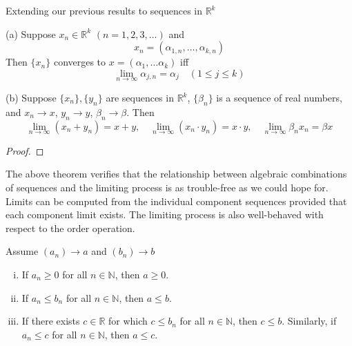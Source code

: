 \begin{theorem} Extending our previous results to sequences in $\mathbb{R}^k$

(a) Suppose $x_n \in \mathbb{R}^k$ $(n=1,2,3,\ldots)$ and
\[x_n = (\alpha_{1,n}, \ldots, \alpha_{k,n})\]
Then $\{x_n\}$ converges to $x = (\alpha_1, \ldots \alpha_k)$ iff 
\[\lim_{n\to\infty}\alpha_{j,n} = \alpha_j \quad (1\leq j \leq k)\]

(b) Suppose $\{x_n\}, \{y_n\}$ are sequences in $\mathbb{R}^k$, $\{\beta_n\}$ is a sequence of real numbers, and $x_n \to x$, $y_n \to y$, $\beta_n \to \beta$. Then
\[\lim_{n\to\infty} (x_n + y_n ) = x+y, \quad \lim_{n\to\infty} (x_n \cdot y_n ) = x\cdot y,  \quad \lim_{n\to\infty} \beta_n x_n  = \beta x\]
\end{theorem}

\begin{proof}

\end{proof}

The above theorem verifies that the relationship between algebraic combinations of sequences and the limiting process is as trouble-free as we could hope for.  Limits can be computed from the individual component sequences provided that each component limit exists.  The limiting process is also well-behaved with respect to the order operation.

\begin{theorem}  Assume $(a_{n}) \to a$ and $(b_{n})\to b$
\begin{enumerate}[(i)]
	\item If $a_{n} \geq 0$ for all $n \in \mathbb{N}$, then $a\geq0$.
	\item If $a_{n}\leq b_{n}$ for all $n \in \mathbb{N}$, then $a\leq b$.
	\item If there exists $c \in \mathbb{R}$ for which $c \leq b_{n}$ for all $n \in \mathbb{N}$, then $c \leq b$.  Similarly, if $a_{n} \leq c$ for all $n \in \mathbb{N}$, then $a\leq c$.
\end{enumerate}
\end{theorem}

